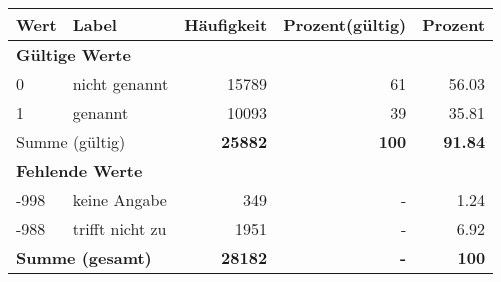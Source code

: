      \begin{longtable}{lXrrr}
     \toprule
     \textbf{Wert} & \textbf{Label} & \textbf{Häufigkeit} & \textbf{Prozent(gültig)} & \textbf{Prozent} \\
     \endhead
     \midrule
     \multicolumn{5}{l}{\textbf{Gültige Werte}}\\

     0 &
     \multicolumn{1}{X}{ nicht genannt   } &


       \num{15789} &
       \num[round-mode=places,round-precision=2]{61} &
         \num[round-mode=places,round-precision=2]{56.03} \\

     1 &
     \multicolumn{1}{X}{ genannt   } &


       \num{10093} &
       \num[round-mode=places,round-precision=2]{39} &
         \num[round-mode=places,round-precision=2]{35.81} \\
     \midrule
     \multicolumn{2}{l}{Summe (gültig)} &
       \textbf{\num{25882}} &
     \textbf{\num{100}} &
       \textbf{\num[round-mode=places,round-precision=2]{91.84}} \\
     \multicolumn{5}{l}{\textbf{Fehlende Werte}}\\
       -998 &
       keine Angabe &
         \num{349} &
        - &
         \num[round-mode=places,round-precision=2]{1.24} \\
       -988 &
       trifft nicht zu &
         \num{1951} &
        - &
         \num[round-mode=places,round-precision=2]{6.92} \\
     \midrule
     \multicolumn{2}{l}{\textbf{Summe (gesamt)}} &
          \textbf{\num{28182}} &
        \textbf{-} &
        \textbf{\num{100}} \\
     \bottomrule
     \end{longtable}
     
